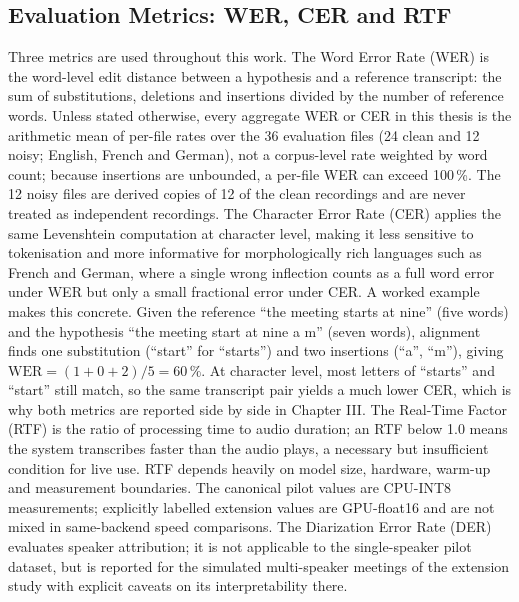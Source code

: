 \documentclass[12pt]{report}
\begin{document}
\subsection{Evaluation Metrics: WER, CER and RTF}
Three metrics are used throughout this work. The Word Error Rate (WER) is the word-level edit distance between a hypothesis and a reference transcript: the sum of substitutions, deletions and insertions divided by the number of reference words. Unless stated otherwise, every aggregate WER or CER in this thesis is the arithmetic mean of per-file rates over the 36 evaluation files (24 clean and 12 noisy; English, French and German), not a corpus-level rate weighted by word count; because insertions are unbounded, a per-file WER can exceed 100\,\%. The 12 noisy files are derived copies of 12 of the clean recordings and are never treated as independent recordings. The Character Error Rate (CER) applies the same Levenshtein computation at character level, making it less sensitive to tokenisation and more informative for morphologically rich languages such as French and German, where a single wrong inflection counts as a full word error under WER but only a small fractional error under CER.
A worked example makes this concrete. Given the reference \enquote{the meeting starts at nine} (five words) and the hypothesis \enquote{the meeting start at nine a m} (seven words), alignment finds one substitution (\enquote{start} for \enquote{starts}) and two insertions (\enquote{a}, \enquote{m}), giving $\mathrm{WER} = (1+0+2)/5 = 60\,\%$. At character level, most letters of \enquote{starts} and \enquote{start} still match, so the same transcript pair yields a much lower CER, which is why both metrics are reported side by side in Chapter III.
The Real-Time Factor (RTF) is the ratio of processing time to audio duration; an RTF below 1.0 means the system transcribes faster than the audio plays, a necessary but insufficient condition for live use. RTF depends heavily on model size, hardware, warm-up and measurement boundaries. The canonical pilot values are CPU-INT8 measurements; explicitly labelled extension values are GPU-float16 and are not mixed in same-backend speed comparisons. The Diarization Error Rate (DER) evaluates speaker attribution; it is not applicable to the single-speaker pilot dataset, but is reported for the simulated multi-speaker meetings of the extension study with explicit caveats on its interpretability there.
\end{document}
